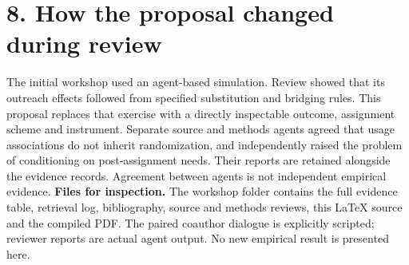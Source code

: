 \documentclass[11pt]{article}
\begin{document}
\section*{8. How the proposal changed during review}
The initial workshop used an agent-based simulation. Review showed that its outreach effects followed from specified substitution and bridging rules. This proposal replaces that exercise with a directly inspectable outcome, assignment scheme and instrument. Separate source and methods agents agreed that usage associations do not inherit randomization, and independently raised the problem of conditioning on post-assignment needs. Their reports are retained alongside the evidence records. Agreement between agents is not independent empirical evidence.
\textbf{Files for inspection.} The workshop folder contains the full evidence table, retrieval log, bibliography, source and methods reviews, this LaTeX source and the compiled PDF. The paired coauthor dialogue is explicitly scripted; reviewer reports are actual agent output. No new empirical result is presented here.
\newpage

\nocite{chandra2025,meng2021,meng2025,young2024,ueda2026}

\end{document}
